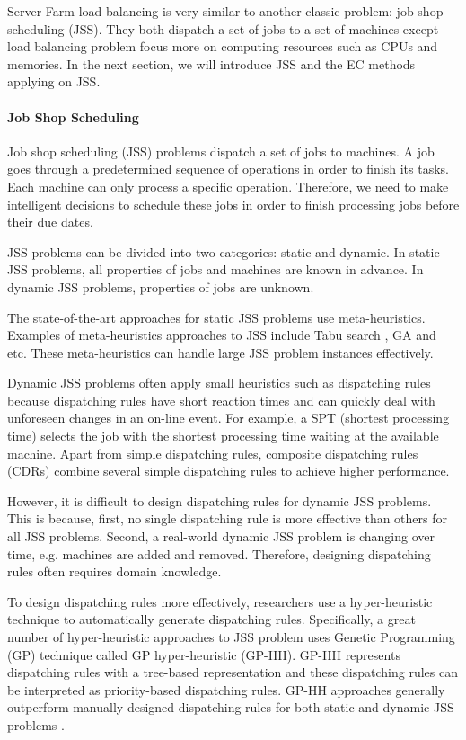 Server Farm load balancing is very similar to another classic problem: job shop scheduling (JSS). They both dispatch a set of jobs to a set of machines except load balancing problem focus more on computing resources such as CPUs and memories. In the next section, we will introduce JSS and the EC methods applying on JSS.
\paragraph{Job Shop Scheduling}
Job shop scheduling (JSS) problems \cite{Potts:2009eb} dispatch a set of jobs to machines. A job goes through a predetermined sequence of operations in order to finish its tasks. Each machine can only process a specific operation. Therefore, we need to make intelligent decisions to schedule these jobs in order to finish processing jobs before their due dates.

JSS problems can be divided into two categories: static and dynamic. In static JSS problems, all properties of jobs and machines are known in advance. In dynamic JSS problems, properties of jobs are unknown.  

The state-of-the-art approaches for static JSS problems use meta-heuristics. Examples of meta-heuristics approaches to JSS include Tabu search \cite{AmaralArmentano:2000dk}, GA \cite{Zhou:2009dq} and etc. These meta-heuristics can handle large JSS problem instances effectively. 

Dynamic JSS problems often apply small heuristics such as dispatching rules \cite{Branke:2016wy} because dispatching rules have short reaction times and can quickly deal with unforeseen changes in an on-line event. For example, a SPT (shortest processing time) selects the job with the shortest processing time waiting at the available machine. Apart from simple dispatching rules, composite dispatching rules (CDRs) \cite{Jayamohan:2004kq} combine several simple dispatching rules to achieve higher performance. 

However, it is difficult to design dispatching rules for dynamic JSS problems. This is because, first, no single dispatching rule is more effective than others for all JSS problems. Second, a real-world dynamic JSS problem is changing over time, e.g. machines are added and removed. Therefore, designing dispatching rules often requires domain knowledge. 

To design dispatching rules more effectively, researchers use a hyper-heuristic technique to automatically generate dispatching rules. Specifically, a great number of hyper-heuristic approaches to JSS problem uses Genetic Programming (GP) technique called GP hyper-heuristic (GP-HH). GP-HH represents dispatching rules with a tree-based representation and these dispatching rules can be interpreted as priority-based dispatching rules. GP-HH approaches generally outperform manually designed dispatching rules for both static and dynamic JSS problems \cite{Branke:2016wy}. 

